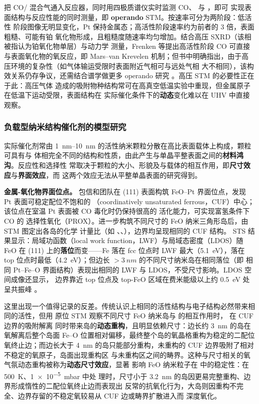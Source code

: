 把 CO/ 混合气通入反应器，同时用四极质谱仪实时监测 CO、 与 ，即可
实现表面结构与反应性能的同时测量，即 \textbf{operando} STM。按速率可分为两阶段：低活性
阶段图像无明显变化，Pt 保持金属态；高活性阶段速率约为前者的 3 倍，表面粗糙、可能有铂
氧化物形成，且粗糙度随速率均匀增加。结合高压 SXRD（该相被指认为铂氧化物单层）与动力学
测量，Frenken 等提出高活性阶段 CO 可直接与表面氧化物的氧反应，即 Mars--van Krevelen
机制；但书中明确指出，由于高压环境的复杂性（如气体输运受限时表面附近气相可与远处气相
大不相同），该构效关系仍存争议，还需结合谱学做更多 operando 研究
。高压 STM 的必要性正在于此：高压气体
造成的吸附物种结构常可在高真空低温实验中重现，但金属原子在低温下运动受限，表面结构在
实际催化条件下的\textbf{动态}变化难以在 UHV 中直接观察。
\subsubsection{负载型纳米结构催化剂的模型研究}
\label{sec:model-nano}

实际催化剂常由 \qtyrange{1}{10}{nm} 的活性纳米颗粒分散在高比表面载体上构成，颗粒可具有与
体相完全不同的结构和性质，由此产生与单晶平整表面之间的\textbf{材料鸿沟}。反应性和选择性
常取决于颗粒的大小、形貌及与载体的相互作用，即\textbf{尺寸效应}与\textbf{界面效应}，而
这两个效应无法从平整单晶表面的研究得到。

\textbf{金属-氧化物界面位点。} 包信和团队在 (111) 表面构筑 FeO--Pt 界面位点，发现
Pt 表面可稳定配位不饱和的 （coordinatively unsaturated ferrous，CUF）中心；
该位点在室温 Pt 表面被 CO 毒化时仍保持很高的  活化能力，可实现富氢条件下 CO 的
选择性氧化（PROX）。进一步构筑不同尺寸的 FeO 纳米三角形岛后，由 STM 图定出各岛的化学
计量比（如 、、），边界均呈现相同的 CUF 结构。
STS 结果显示：局域功函数（local work function，LWF）与局域态密度（LDOS）随 FeO 在
(111) 上的\textbf{落位}而变——Fe 落在 fcc 位点时 LWF 最大（\qty{5.1}{eV}），落在
top 位点时最低（\qty{4.2}{eV}）；但边长 $>\qty{3}{nm}$ 的不同尺寸纳米岛在相同落位（即
相同 Pt--Fe--O 界面结构）表现出相同的 LWF 与 LDOS，不受尺寸影响。LDOS 空间成像还显示，
边界靠近 top 位点及 top-FeO 区域在费米能级以上约 \qty{0.5}{eV} 处呈共振峰
。

这里出现一个值得记录的反差。传统认识上相同的活性结构与电子结构必然带来相同的活性，但用
原位 STM 观察不同尺寸 FeO 纳米岛与  的相互作用时， 在 CUF 边界的吸附解离
同时带来岛的\textbf{动态重构}，且明显依赖尺寸：边长约 \qty{3}{nm} 的岛在氧解离后整个岛面
Fe--O 位置相对偏移，最终整个岛的氧晶格重构为稳定的二配位氧终止边；而边长大于
\qty{4}{nm} 的岛只能部分重构，未重构的 CUF 边界吸附了相对不稳定的氧原子，岛面出现重构区
与未重构区之间的畴界。这种与尺寸相关的氧气氛动态重构被称为\textbf{动态尺寸效应}，显著
影响 FeO 纳米粒子在  中的稳定性：在 \qty{500}{K}、\qty{1e-5}{mbar}  中处
理时，尺寸小于 \qty{3.2}{nm} 的岛因更易完整重构、边界形成惰性的二配位氧终止边而表现出
反常的抗氧化行为，大岛则因重构不完全、边界存留的不稳定氧较易从 CUF 边或畴界扩散进入而
深度氧化。

